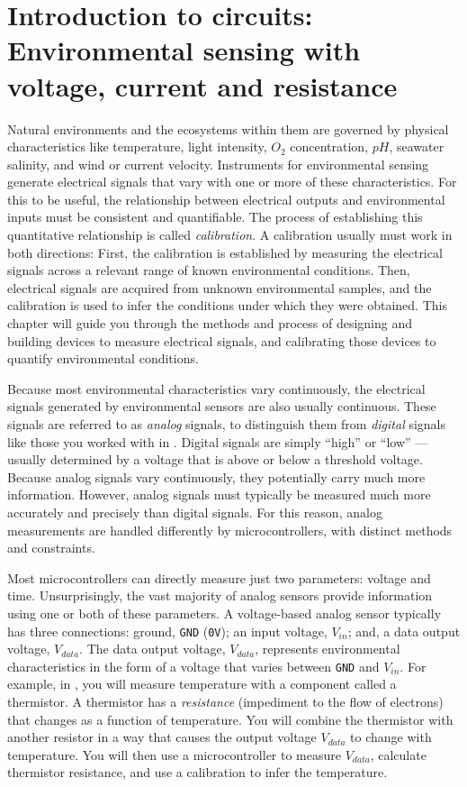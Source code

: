 \setchapterpreamble[u]{\margintoc}
\chapter[Environmental sensing with voltage, current and resistance]{Introduction to circuits: Environmental sensing with voltage, current and resistance}
Natural environments and the ecosystems within them are governed by physical characteristics like temperature, light intensity, $O_2$ concentration, $pH$, seawater salinity, and wind or current velocity.
Instruments for environmental sensing generate electrical signals that vary with one or more of these characteristics.
For this to be useful, the relationship between electrical outputs and environmental inputs must be consistent and quantifiable.
The process of establishing this quantitative relationship is called \emph{calibration}.
A calibration usually must work in both directions:
First, the calibration is established by measuring the electrical signals across a relevant range of known environmental conditions.
Then,  electrical signals are acquired from unknown environmental samples, and the calibration is used to infer the conditions under which they were obtained.
This chapter will guide you through the methods and process of designing and building devices to measure electrical signals, and calibrating those devices to quantify environmental conditions.

Because most environmental characteristics vary continuously, the electrical signals generated by environmental sensors are also usually continuous.
These signals are referred to as \emph{analog} signals, to distinguish them from \emph{digital} signals like those you worked with in .
Digital signals are simply ``high'' or ``low'' --- usually determined by a voltage that is above or below a threshold voltage.
Because analog signals vary continuously, they potentially carry much more information.
However, analog signals must typically be measured much more accurately and precisely than digital signals.
For this reason, analog measurements are handled differently by microcontrollers, with distinct methods and constraints.

Most microcontrollers can directly measure just two parameters: voltage and time.
Unsurprisingly, the vast majority of analog sensors provide information using one or both of these parameters.
A voltage-based analog sensor typically has three connections: ground, \texttt{GND} (\texttt{0V}); an input voltage, $V_{in}$; and, a data output voltage, $V_{data}$.
The data output voltage, $V_{data}$, represents environmental characteristics in the form of a voltage that varies between \texttt{GND} and $V_{in}$.
For example, in , you will measure temperature with a component called a thermistor.
A thermistor has a \emph{resistance} (impediment to the flow of electrons) that changes as a function of temperature.
You will combine the thermistor with another resistor in a way that causes the output voltage $V_{data}$ to change with temperature.
You will then use a microcontroller to measure $V_{data}$, calculate thermistor resistance, and use a calibration to infer the temperature.

